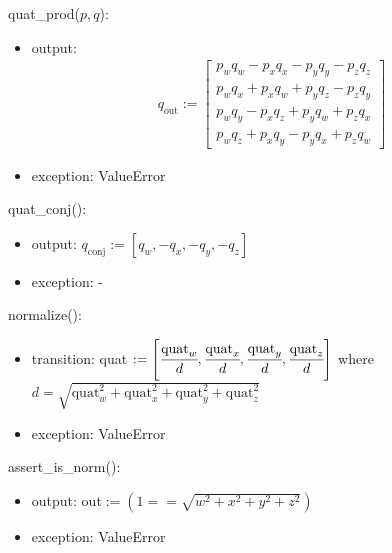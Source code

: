 \documentclass[12pt, titlepage]{article}
\begin{document}
\noindent quat\_prod($p, q$):
\begin{itemize}
\item output:
  \begin{align*}
    q_\text{out} :=  \begin{bmatrix}
      p_w q_w - p_x q_x - p_y q_y - p_z q_z \\
      p_w q_x + p_x q_w + p_y q_z - p_z q_y \\
      p_w q_y - p_x q_z + p_y q_w + p_z q_x \\
      p_w q_z + p_x q_y - p_y q_x + p_z q_w
  \end{bmatrix}
  \end{align*}

\item exception: ValueError
\end{itemize}

\noindent quat\_conj():
\begin{itemize}
\item output: $q_\text{conj} :=  [q_w, -q_x, -q_y, -q_z]$
\item exception: -
\end{itemize}

\noindent normalize():
\begin{itemize}
\item transition: quat $:= \left[ \cfrac{\text{quat}_w}{d}, \cfrac{\text{quat}_x}{d},
\cfrac{\text{quat}_y}{d}, \cfrac{\text{quat}_z}{d} \right]$ where $d = \sqrt{\text{quat}_w^2 +
\text{quat}_x^2 + \text{quat}_y^2 + \text{quat}_z^2}$
\item exception: ValueError
\end{itemize}

\noindent assert\_is\_norm():
\begin{itemize}
\item output: out$:= (1 == \sqrt{w^2 + x^2 + y^2 + z^2})$
\item exception: ValueError
\end{itemize}
\end{document}
